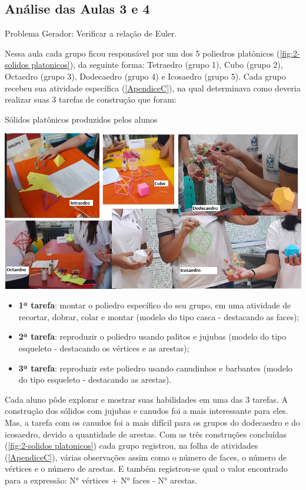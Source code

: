 \subsection{Análise das Aulas 3 e 4}

Problema Gerador: Verificar a relação de Euler.

Nessa aula cada grupo ficou responsável por um dos 5 poliedros platônicos (\autoref{fig:2-solidos platonicos}), da seguinte forma:  Tetraedro (grupo 1), Cubo (grupo 2), Octaedro (grupo 3), Dodecaedro  (grupo 4) e Icosaedro (grupo 5). Cada grupo recebeu sua atividade específica (\autoref{ApendiceC}), na qual determinava como deveria realizar suas 3 tarefas de construção que foram:

\begin{CenteredFigure}
    \caption{Sólidos platônicos produzidos pelos alunos} \label{fig:2-solidos platonicos}
    \includegraphics[width=\linewidth]{Imagens/Novas imagens/Sólidos Platônicos compilado}
    \legend{\autoria}
\end{CenteredFigure}

\begin{itemize}
    \item \textbf{1ª tarefa}:  montar o poliedro específico do seu grupo, em uma atividade de recortar, dobrar, colar e montar (modelo do tipo casca - destacando as faces);
    \item \textbf{2ª tarefa}: reproduzir o poliedro usando palitos e jujubas (modelo do tipo esqueleto - destacando os  vértices e as arestas);
    \item \textbf{3ª tarefa}: reproduzir este poliedro usando canudinhos e barbantes (modelo do tipo esqueleto - destacando as arestas).
\end{itemize}

Cada aluno pôde explorar e mostrar suas habilidades em uma das 3 tarefas. A construção dos sólidos com jujubas e canudos foi a mais interessante para eles. Mas, a tarefa com os canudos foi a mais difícil para os grupos do dodecaedro e do icosaedro, devido a quantidade de arestas. Com as três construções concluídas (\autoref{fig:2-solidos platonicos}) cada grupo registrou, na folha de atividades (\autoref{ApendiceC}), várias observações assim como o número de faces, o número de vértices e o número de arestas. E também registrou-se qual o valor encontrado para a expressão: N° vértices + N° faces - N° arestas.

